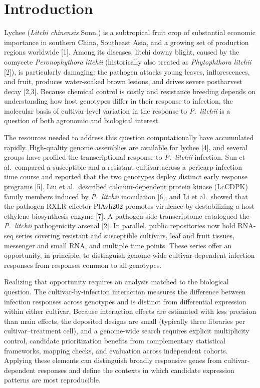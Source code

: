 \documentclass[referee,pdflatex,sn-basic,Numbered]{sn-jnl}
\newcommand{\Pl}{\textit{P.~litchii}}
\begin{document}
\maketitle

\section{Introduction}\label{sec:introduction}

Lychee (\textit{Litchi chinensis} Sonn.) is a subtropical fruit crop of substantial economic importance in southern China, Southeast Asia, and a growing set of production regions worldwide [1]. Among its diseases, litchi downy blight, caused by the oomycete \textit{Peronophythora litchii} (historically also treated as \textit{Phytophthora litchii} [2]), is particularly damaging: the pathogen attacks young leaves, inflorescences, and fruit, produces water-soaked brown lesions, and drives severe postharvest decay [2,3]. Because chemical control is costly and resistance breeding depends on understanding how host genotypes differ in their response to infection, the molecular basis of cultivar-level variation in the response to \Pl{} is a question of both agronomic and biological interest.

The resources needed to address this question computationally have accumulated rapidly. High-quality genome assemblies are available for lychee [4], and several groups have profiled the transcriptional response to \Pl{} infection. Sun et al.\ compared a susceptible and a resistant cultivar across a pericarp infection time course and reported that the two genotypes deploy distinct early response programs [5]. Liu et al.\ described calcium-dependent protein kinase (LcCDPK) family members induced by \Pl{} inoculation [6], and Li et al.\ showed that the pathogen RXLR effector PlAvh202 promotes virulence by destabilizing a host ethylene-biosynthesis enzyme [7]. A pathogen-side transcriptome catalogued the \Pl{} pathogenicity arsenal [2]. In parallel, public repositories now hold RNA-seq series covering resistant and susceptible cultivars, leaf and fruit tissues, messenger and small RNA, and multiple time points. These series offer an opportunity, in principle, to distinguish genome-wide cultivar-dependent infection responses from responses common to all genotypes.

Realizing that opportunity requires an analysis matched to the biological question. The cultivar-by-infection interaction measures the difference between infection responses across genotypes and is distinct from differential expression within either cultivar. Because interaction effects are estimated with less precision than main effects, the deposited designs are small (typically three libraries per cultivar--treatment cell), and a genome-wide search requires explicit multiplicity control, candidate prioritization benefits from complementary statistical frameworks, mapping checks, and evaluation across independent cohorts. Applying these elements can distinguish broadly responsive genes from cultivar-dependent responses and define the contexts in which candidate expression patterns are most reproducible.
\end{document}
